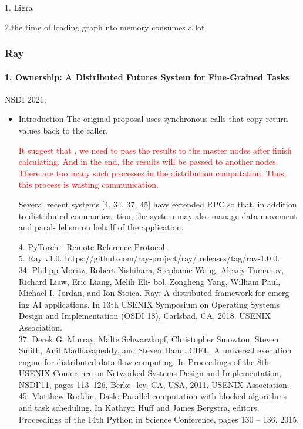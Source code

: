 \documentclass[UTF8]{article}
\newcommand{\com}[1]{\textcolor{red}{#1}}
\begin{document}
1. Ligra 

2.the time of loading graph nto memory consumes a lot. 

\subsubsection{Ray}
\paragraph{1. Ownership: A Distributed Futures System for Fine-Grained Tasks~\cite{wang2021ownership}}
NSDI 2021; 

\begin{itemize}
	
	\item Introduction
	The original proposal uses synchronous calls that copy return values back to the caller. 
	
	\com{It suggest that , we need to pass the results to the master nodes after finish calculating. And in the end, the results will be passed to another nodes. There are too many such processes in the distribution computation. Thus, this process is wasting communication.} 
	
	Several recent systems [4, 34, 37, 45] have extended RPC so that, in addition to distributed communica- tion, the system may also manage data movement and paral- lelism on behalf of the application.
	
	4. PyTorch - Remote Reference Protocol. \\
	5. Ray v1.0. https://github.com/ray-project/ray/ releases/tag/ray-1.0.0.\\
	34. Philipp Moritz, Robert Nishihara, Stephanie Wang, Alexey Tumanov, Richard Liaw, Eric Liang, Melih Eli- bol, Zongheng Yang, William Paul, Michael I. Jordan, and Ion Stoica. Ray: A distributed framework for emerg- ing AI applications. In 13th USENIX Symposium on Operating Systems Design and Implementation (OSDI 18), Carlsbad, CA, 2018. USENIX Association.\\
	37. Derek G. Murray, Malte Schwarzkopf, Christopher Smowton, Steven Smith, Anil Madhavapeddy, and Steven Hand. CIEL: A universal execution engine for distributed data-flow computing. In Proceedings of the 8th USENIX Conference on Networked Systems Design and Implementation, NSDI’11, pages 113–126, Berke- ley, CA, USA, 2011. USENIX Association.\\
	45. Matthew Rocklin. Dask: Parallel computation with blocked algorithms and task scheduling. In Kathryn Huff and James Bergstra, editors, Proceedings of the 14th Python in Science Conference, pages 130 – 136, 2015.\\

\end{itemize}
\end{document}
